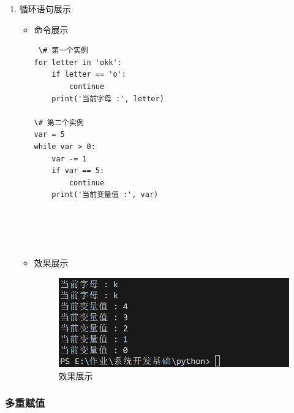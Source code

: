 \documentclass[UTF8]{ctexart}
\begin{document}
\begin{enumerate}
  \item 循环语句展示
  \begin{itemize}
  \item 命令展示
  \begin{verbatim}
 \# 第一个实例
for letter in 'okk':
    if letter == 'o':
        continue
    print('当前字母 :', letter)

\# 第二个实例
var = 5
while var > 0:
    var -= 1
    if var == 5:
        continue
    print('当前变量值 :', var)



    
  \end{verbatim}

  \item 效果展示
  \begin{figure}[H]
    \centering
    \includegraphics[width=\textwidth]{26} %
    \caption{效果展示}
  
  \end{figure}
\end{itemize}
\end{enumerate}






















\subsubsection{多重赋值 }
\end{document}
